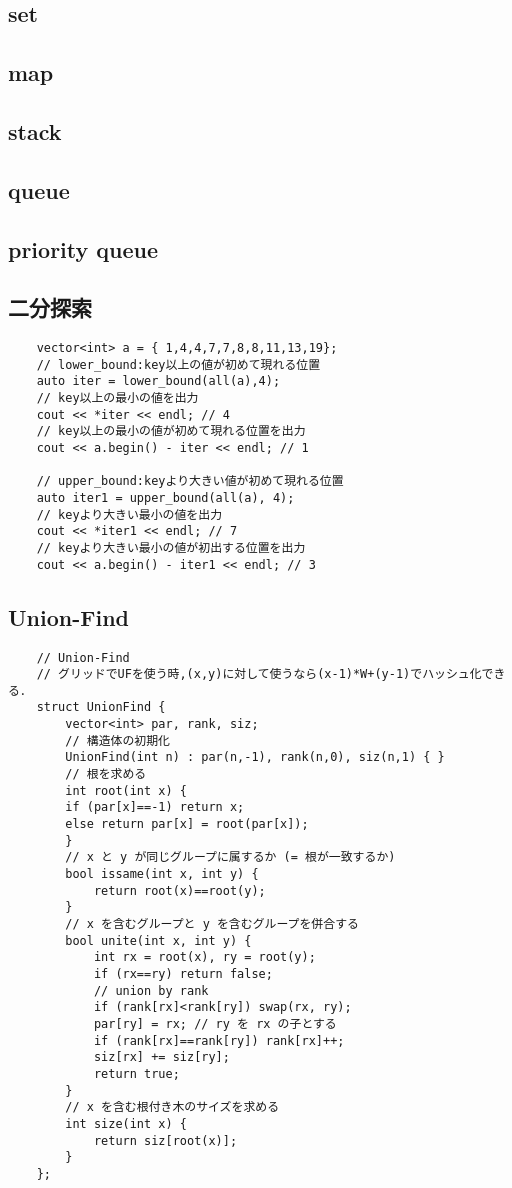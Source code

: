 \documentclass[a4paper, landscape, 9pt]{jarticle} %
\begin{document}
\begin{multicols*}{3}
    \subsection{set}
    \subsection{map}
    \subsection{stack}
    \subsection{queue}
    \subsection{priority queue}
    \subsection{二分探索}
    \begin{lstlisting}
    vector<int> a = { 1,4,4,7,7,8,8,11,13,19};
    // lower_bound:key以上の値が初めて現れる位置
    auto iter = lower_bound(all(a),4);
    // key以上の最小の値を出力
    cout << *iter << endl; // 4
    // key以上の最小の値が初めて現れる位置を出力
    cout << a.begin() - iter << endl; // 1

    // upper_bound:keyより大きい値が初めて現れる位置
    auto iter1 = upper_bound(all(a), 4);
    // keyより大きい最小の値を出力
    cout << *iter1 << endl; // 7
    // keyより大きい最小の値が初出する位置を出力
    cout << a.begin() - iter1 << endl; // 3

    \end{lstlisting}

    \subsection{Union-Find}
    \begin{lstlisting}
    // Union-Find
    // グリッドでUFを使う時,(x,y)に対して使うなら(x-1)*W+(y-1)でハッシュ化できる．
    struct UnionFind {
        vector<int> par, rank, siz;
        // 構造体の初期化
        UnionFind(int n) : par(n,-1), rank(n,0), siz(n,1) { }
        // 根を求める
        int root(int x) {
        if (par[x]==-1) return x;
        else return par[x] = root(par[x]);
        }
        // x と y が同じグループに属するか (= 根が一致するか)
        bool issame(int x, int y) {
            return root(x)==root(y);
        }
        // x を含むグループと y を含むグループを併合する
        bool unite(int x, int y) {
            int rx = root(x), ry = root(y);
            if (rx==ry) return false;
            // union by rank
            if (rank[rx]<rank[ry]) swap(rx, ry);
            par[ry] = rx; // ry を rx の子とする
            if (rank[rx]==rank[ry]) rank[rx]++;
            siz[rx] += siz[ry];
            return true;
        }
        // x を含む根付き木のサイズを求める
        int size(int x) {
            return siz[root(x)];
        }
    };
    

\end{lstlisting}
\end{multicols*}
\end{document}
